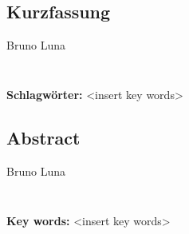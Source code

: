 
\subsection*{Kurzfassung}

Bruno Luna
\subsubsection*{\dissTitle}

%
\mbox{}\\[0.5\baselineskip]\noindent
\textbf{Schlagwörter:} 
<insert key words>
\clearpage
\subsection*{Abstract}

Bruno Luna
\subsubsection*{\dissTitle}

%
\mbox{}\\[0.5\baselineskip]\noindent
\textbf{Key words:} 
<insert key words>